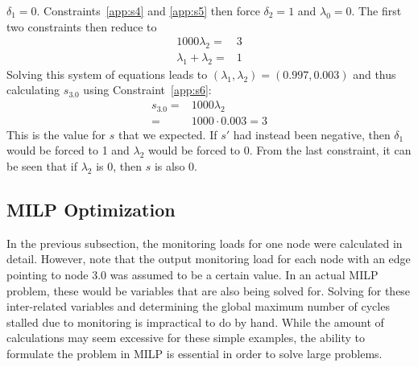 $\delta_1 = 0$. Constraints~\ref{app:s4} and \ref{app:s5} then force $\delta_2 = 1$ and $\lambda_0 =
0$. The first two constraints then reduce to
\begin{align*}
  1000\lambda_2 =& 3\\
  \lambda_1 + \lambda_2 =& 1 
\end{align*}
Solving this system of equations leads to $(\lambda_1, \lambda_2) = (0.997, 0.003)$ and thus calculating $s_{3.0}$ using Constraint~\ref{app:s6}:
\begin{align*}
  s_{3.0} =& 1000 \lambda_2 \\
  =& 1000 \cdot 0.003 = 3
\end{align*}
This is the value for $s$ that we expected. If $s'$ had instead been negative,
then $\delta_1$ would be forced to 1 and $\lambda_2$ would be forced to 0. From
the last constraint, it can be seen that if $\lambda_2$ is 0, then $s$ is also
0.

\subsection{MILP Optimization}

In the previous subsection, the monitoring loads for one node were calculated
in detail. However, note that the output monitoring load for each node with an
edge pointing to node 3.0 was assumed to be a certain value. In an actual MILP
problem, these would be variables that are also being solved for. Solving for
these inter-related variables and determining the global maximum number of
cycles stalled due to monitoring is impractical to do by hand. 
While the amount of calculations
may seem excessive for these simple examples, the ability to formulate the
problem in MILP is essential in order to solve large problems.


